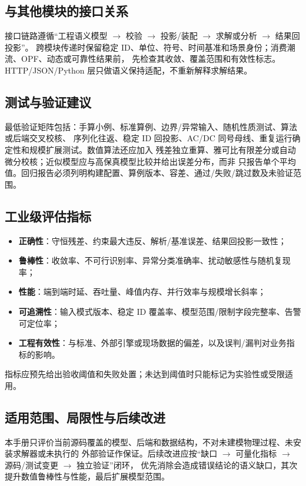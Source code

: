 \subsection{与其他模块的接口关系}
接口链路遵循“工程语义模型 $\to$ 校验 $\to$ 投影/装配 $\to$ 求解或分析 $\to$ 结果回投影”。
跨模块传递时保留稳定 ID、单位、符号、时间基准和场景身份；消费潮流、OPF、动态或可靠性结果前，
先检查其收敛、覆盖范围和有效性标志。HTTP/JSON/Python 层只做语义保持适配，不重新解释求解结果。

\subsection{测试与验证建议}
最低验证矩阵包括：手算小例、标准算例、边界/异常输入、随机性质测试、算法或后端交叉校核、
序列化往返、稳定 ID 回投影、AC/DC 同号母线、重复运行确定性和规模扩展测试。数值算法还应加入
残差独立重算、雅可比有限差分或自动微分校核；近似模型应与高保真模型比较并给出误差分布，而非
只报告单个平均值。回归报告必须列明构建配置、算例版本、容差、通过/失败/跳过数及未验证范围。

\subsection{工业级评估指标}
\begin{itemize}
  \item \textbf{正确性}：守恒残差、约束最大违反、解析/基准误差、结果回投影一致性；
  \item \textbf{鲁棒性}：收敛率、不可行识别率、异常分类准确率、扰动敏感性与随机复现率；
  \item \textbf{性能}：端到端时延、吞吐量、峰值内存、并行效率与规模增长斜率；
  \item \textbf{可追溯性}：输入模式版本、稳定 ID 覆盖率、模型范围/限制字段完整率、告警可定位率；
  \item \textbf{工程有效性}：与标准、外部引擎或现场数据的偏差，以及误判/漏判对业务指标的影响。
\end{itemize}
指标应预先给出验收阈值和失败处置；未达到阈值时只能标记为实验性或受限适用。

\subsection{适用范围、局限性与后续改进}
本手册只评价当前源码覆盖的模型、后端和数据结构，不对未建模物理过程、未安装求解器或未执行的
外部验证作保证。后续改进应按“缺口 $\to$ 可量化指标 $\to$ 源码/测试变更 $\to$ 独立验证”闭环，
优先消除会造成错误结论的语义缺口，其次提升数值鲁棒性与性能，最后扩展模型范围。
